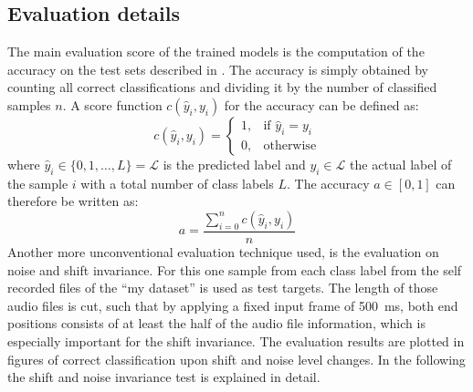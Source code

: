 \subsection{Evaluation details}\label{sec:exp_details_tb}
The main evaluation score of the trained models is the computation of the accuracy on the test sets described in .
The accuracy is simply obtained by counting all correct classifications and dividing it by the number of classified samples $n$.
A score function $c(\hat{y}_i, y_i)$ for the accuracy can be defined as:
\begin{equation}
  c(\hat{y}_i, y_i) = 
  \begin{cases}
    1, & \text{if } \hat{y}_i = y_i\\
    0, & \text{otherwise} 
  \end{cases}
\end{equation}
where $\hat{y}_i \in \{0, 1, \dots, L\} = \mathcal{L}$ is the predicted label and $y_i \in \mathcal{L}$ the actual label of the sample $i$ with a total number of class labels $L$.
The accuracy $a \in [0, 1]$ can therefore be written as:
\begin{equation}
  a = \frac{\sum_{i=0}^n c(\hat{y}_i, y_i)}{n}
\end{equation}
Another more unconventional evaluation technique used, is the evaluation on noise and shift invariance.
For this one sample from each class label from the self recorded files of the \enquote{my dataset} is used as test targets.
The length of those audio files is cut, such that by applying a fixed input frame of \SI{500}{\milli\second}, both end positions consists of at least the half of the audio file information, which is especially important for the shift invariance.
The evaluation results are plotted in figures of correct classification upon shift and noise level changes.
In the following the shift and noise invariance test is explained in detail.




